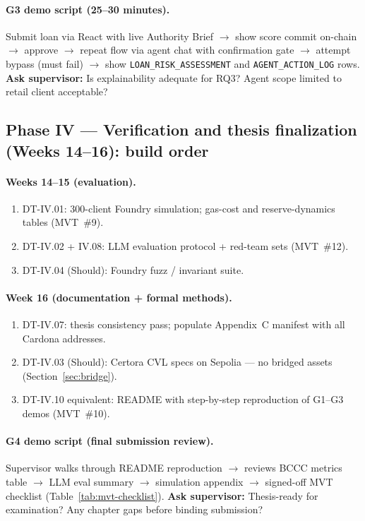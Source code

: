 \documentclass[12pt,a4paper]{report}
\begin{document}
\paragraph{G3 demo script (25--30 minutes).}
Submit loan via React with live Authority Brief $\to$ show score commit on-chain $\to$ approve $\to$ repeat flow via agent chat with confirmation gate $\to$ attempt bypass (must fail) $\to$ show \texttt{LOAN\_RISK\_ASSESSMENT} and \texttt{AGENT\_ACTION\_LOG} rows. \textbf{Ask supervisor:} Is explainability adequate for RQ3? Agent scope limited to retail client acceptable?

\subsection{Phase IV --- Verification and thesis finalization (Weeks 14--16): build order}

\paragraph{Weeks 14--15 (evaluation).}
\begin{enumerate}[noitemsep]
\item DT-IV.01: 300-client Foundry simulation; gas-cost and reserve-dynamics tables (MVT~\#9).
\item DT-IV.02 + IV.08: LLM evaluation protocol + red-team sets (MVT~\#12).
\item DT-IV.04 (Should): Foundry fuzz / invariant suite.
\end{enumerate}

\paragraph{Week 16 (documentation + formal methods).}
\begin{enumerate}[noitemsep]
\item DT-IV.07: thesis consistency pass; populate Appendix~C manifest with all Cardona addresses.
\item DT-IV.03 (Should): Certora CVL specs on Sepolia --- no bridged assets (Section~\ref{sec:bridge}).
\item DT-IV.10 equivalent: README with step-by-step reproduction of G1--G3 demos (MVT~\#10).
\end{enumerate}

\paragraph{G4 demo script (final submission review).}
Supervisor walks through README reproduction $\to$ reviews BCCC metrics table $\to$ LLM eval summary $\to$ simulation appendix $\to$ signed-off MVT checklist (Table~\ref{tab:mvt-checklist}). \textbf{Ask supervisor:} Thesis-ready for examination? Any chapter gaps before binding submission?
\end{document}
